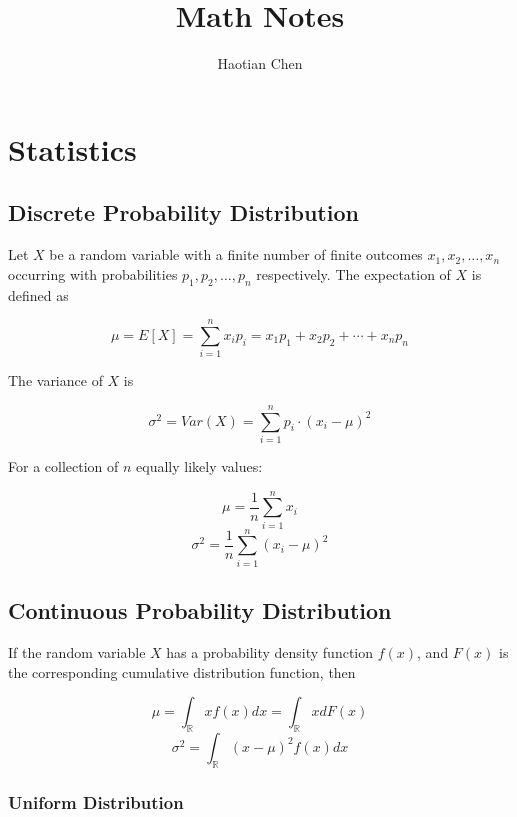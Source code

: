 \documentclass{article}
\title{Math Notes}
\author{Haotian Chen}
\date{}
\begin{document}
\maketitle

\clearpage

\tableofcontents{}

\clearpage

\section{Statistics}

\subsection{Discrete Probability Distribution}

\noindent Let \(X\) be a random variable with a finite number of finite outcomes \( x_{1},  x_{2}, \ldots, x_{n}\) occurring with probabilities \(p_{1}, p_{2}, \ldots, p_{n}\) respectively. The expectation of \(X\) is defined as

\[\mu = E[X] = \sum_{i=1}^{n}x_{i} p_{i} = x_{1} p_{1} + x_{2} p_{2} + \cdots  + x_{n} p_{n}\]

\noindent The variance of \(X\) is

\[\sigma^{2} = Var(X) = \sum_{i=1}^{n}p_{i} \cdot (x_{i} - \mu)^{2}\]

\noindent For a collection of \(n\) equally likely values:

\[\mu = \frac {1}{n} \sum_{i=1}^{n} x_{i}\]
\[\sigma^{2} = \frac {1}{n} \sum_{i=1}^{n} (x_{i} - \mu)^{2}\]

\subsection{Continuous Probability Distribution}

\noindent If the random variable \(X\) has a probability density function \(f(x)\), and \(F(x)\) is the corresponding cumulative distribution function, then

\[\mu =\int_{\mathbb{R}} x f(x) dx = \int_{\mathbb{R}} x dF(x)\]
\[\sigma^{2} = \int_{\mathbb{R}}(x - \mu)^{2} f(x) dx\]

\subsubsection{Uniform Distribution}
\end{document}
